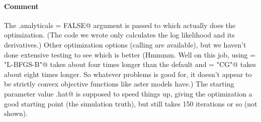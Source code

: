 \documentclass[11pt]{article}
\begin{document}
\paragraph{Comment} The \verb@check.analyticals = FALSE@ argument
is passed to \verb@nlm@ which actually does the optimization.  (The
code we wrote only calculates the log likelihood and its derivatives.)
Other optimization options (calling \verb@optim@ are available), but
we haven't done extensive testing to see which is better (Hmmmm.  Well
on this job, using \verb@method = "L-BFGS-B"@ takes about four times
longer than the default and \verb@method = "CG"@ takes about eight times
longer.  So whatever problems \verb@optim@ is good for, it doesn't appear
to be strictly convex objective functions like aster models have.)
The starting parameter value \verb@beta.hat@ is supposed to speed things
up, giving the optimization a good starting point (the simulation truth),
but \verb@nlm@ still takes 150 iterations or so (not shown).
\end{document}
